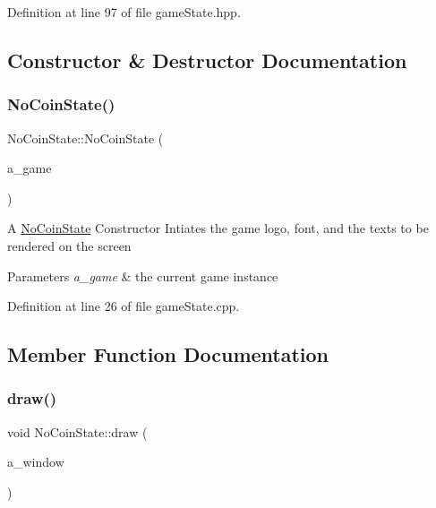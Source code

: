 Definition at line 97 of file game\+State.\+hpp.



\subsection{Constructor \& Destructor Documentation}
\mbox{\label{class_no_coin_state_a3c0129051f00eb142a2055e181264549}} 
\subsubsection{\texorpdfstring{No\+Coin\+State()}{NoCoinState()}}
{\footnotesize\ttfamily No\+Coin\+State\+::\+No\+Coin\+State (\begin{DoxyParamCaption}\item[{\hyperlink{class_game}{Game} $\ast$}]{a\+\_\+game }\end{DoxyParamCaption})}

A \hyperlink{class_no_coin_state}{No\+Coin\+State} Constructor Intiates the game logo, font, and the texts to be rendered on the screen 
\begin{DoxyParams}{Parameters}
{\em a\+\_\+game} & the current game instance \\
\hline
\end{DoxyParams}


Definition at line 26 of file game\+State.\+cpp.



\subsection{Member Function Documentation}
\mbox{\label{class_no_coin_state_ab1e920e22b90f9d36954e75ea49c3f9b}} 
\subsubsection{\texorpdfstring{draw()}{draw()}}
{\footnotesize\ttfamily void No\+Coin\+State\+::draw (\begin{DoxyParamCaption}\item[{sf\+::\+Render\+Window \&}]{a\+\_\+window }\end{DoxyParamCaption})\hspace{0.3cm}{\ttfamily [virtual]}}

